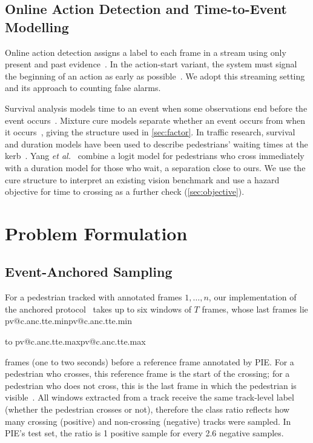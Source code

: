 \documentclass[10pt,a4paper,twocolumn]{article}
\makeatletter
\newcommand{\V}[1]{\ifcsname pv@#1\endcsname\csname pv@#1\endcsname\else
  \PackageError{numbers}{Unknown number key: #1}{Run figures/make_tables.py}\fi}
\makeatother
\begin{document}
\subsection{Online Action Detection and Time-to-Event Modelling}
Online action detection assigns a label to each frame in a stream using only
present and past evidence~\cite{degeest2016oad}. In the action-start variant,
the system must signal the beginning of an action as early as
possible~\cite{shou2018odas}. We adopt this streaming setting and its approach
to counting false alarms.

Survival analysis models time to an event when some observations end before
the event occurs~\cite{cox1972regression}. Mixture cure models separate
whether an event occurs from when it occurs~\cite{farewell1982cure,kuk1992mixture},
giving the structure used in \cref{sec:factor}. In traffic research, survival
and duration models have been used to describe pedestrians' waiting times at
the kerb~\cite{hamed2001waiting,li2013waiting}. Yang
\emph{et al.}~\cite{aft2015waiting} combine a logit model for pedestrians who
cross immediately with a duration model for those who wait, a separation close
to ours. We use the cure structure
to interpret an existing vision benchmark and use a hazard objective for time
to crossing as a further check (\cref{sec:objective}).


\section{Problem Formulation}
\label{sec:formulation}

\subsection{Event-Anchored Sampling}
For a pedestrian tracked with annotated frames $1, \dots, n$, our
implementation of the anchored protocol~\cite{kotseruba2021benchmark} takes up
to six windows of $T$ frames, whose last frames lie \V{c.anc.tte.min} to
\V{c.anc.tte.max} frames (one to two seconds) before a reference frame
annotated by PIE. For a pedestrian who crosses, this reference frame is the
start of the crossing; for a pedestrian who does not cross, this is the last
frame in which the pedestrian is visible~\cite{kotseruba2021benchmark}. All
windows extracted from a track receive the same track-level label (whether the
pedestrian crosses or not), therefore the class ratio reflects how many
crossing (positive) and non-crossing (negative) tracks were sampled. In PIE's
test set, the ratio is 1 positive sample for every 2.6 negative samples.
\end{document}
